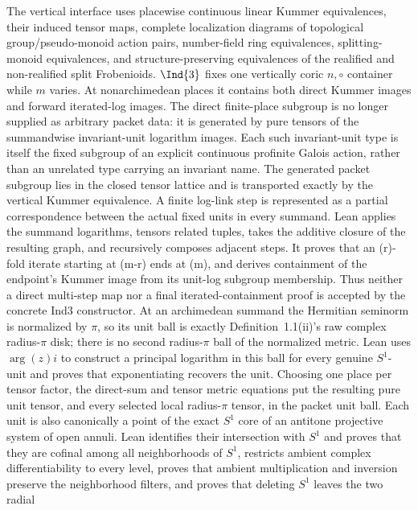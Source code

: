 \begin{definition}
  The vertical interface uses placewise continuous linear Kummer
  equivalences, their induced tensor maps, complete localization diagrams of
  topological group/pseudo-monoid action pairs, number-field ring equivalences,
  splitting-monoid equivalences, and
  structure-preserving equivalences of the realified and non-realified split
  Frobenioids.  \(\Ind{3}\) fixes one vertically coric \(n,\circ\) container
  while \(m\) varies.  At nonarchimedean places it contains both direct Kummer
  images and forward iterated-log images.  The direct finite-place subgroup is
  no longer supplied as arbitrary packet data: it is generated by pure tensors
  of the summandwise invariant-unit logarithm images.  Each such invariant-unit
  type is itself the fixed subgroup of an explicit continuous profinite Galois
  action, rather than an unrelated type carrying an invariant name.  The
  generated packet subgroup lies in the closed tensor lattice and is
  transported exactly by the vertical Kummer equivalence.  A finite log-link
  step is represented as a partial correspondence between the actual fixed
  units in every summand.  Lean applies the summand logarithms, tensors related
  tuples, takes the additive closure of the resulting graph, and recursively
  composes adjacent steps.  It proves that an (r)-fold iterate starting at
  (m-r) ends at (m), and derives containment of the endpoint's Kummer image
  from its unit-log subgroup membership.  Thus neither a direct multi-step map
  nor a final iterated-containment proof is accepted by the concrete Ind3
  constructor.  At an archimedean summand the Hermitian seminorm is normalized
  by \(\pi\), so its unit ball is exactly Definition~1.1(ii)'s raw complex
  radius-\(\pi\) disk; there is no second radius-\(\pi\) ball of the normalized
  metric.  Lean uses \(\arg(z)i\) to construct a principal logarithm in this
  ball for every genuine \(S^1\)-unit and proves that exponentiating recovers
  the unit.  Choosing one place per tensor factor, the direct-sum and tensor
  metric equations put the resulting pure unit tensor, and every selected
  local radius-\(\pi\) tensor, in the packet unit ball.  Each unit is also
  canonically a point of the exact \(S^1\) core of an antitone projective system
  of open annuli.  Lean identifies their intersection with \(S^1\) and proves
  that they are cofinal among all neighborhoods of \(S^1\), restricts ambient
  complex differentiability to every level, proves that ambient multiplication
  and inversion preserve the neighborhood filters, and proves that deleting
  \(S^1\) leaves the two radial

\end{definition}
